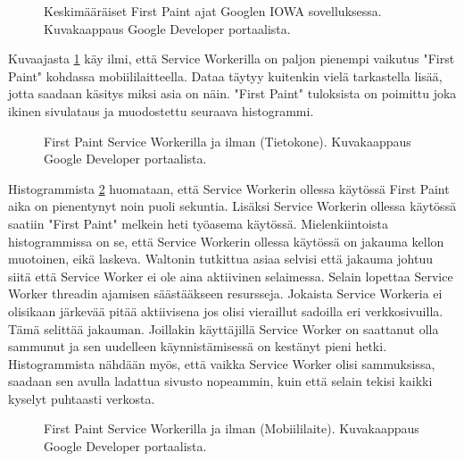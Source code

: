 \documentclass{tktltiki}
\begin{document}
\begin{figure}[!h]
\begin{center}
\caption{Keskimääräiset First Paint ajat Googlen IOWA sovelluksessa. Kuvakaappaus Google Developer portaalista.}
\label{Google AVG load times 1}
\end{center}
\end{figure}

Kuvaajasta \ref{Google AVG load times 1} käy ilmi, että Service Workerilla on paljon pienempi vaikutus "First Paint" kohdassa mobiililaitteella. Dataa täytyy kuitenkin vielä tarkastella lisää, jotta saadaan käsitys miksi asia on näin. "First Paint" tuloksista on poimittu joka ikinen sivulataus ja muodostettu seuraava histogrammi.

\begin{figure}[h]
\begin{center}
\caption{First Paint Service Workerilla ja ilman (Tietokone). Kuvakaappaus Google Developer portaalista.}
\label{Google AVG load times 2}
\end{center}
\end{figure}

Histogrammista \ref{Google AVG load times 2} huomataan, että Service Workerin ollessa käytössä First Paint aika on pienentynyt noin puoli sekuntia. Lisäksi Service Workerin ollessa käytössä saatiin "First Paint" melkein heti työasema käytössä. Mielenkiintoista histogrammissa on se, että Service Workerin ollessa käytössä on jakauma kellon muotoinen, eikä laskeva. Waltonin tutkittua asiaa selvisi että jakauma johtuu siitä että Service Worker ei ole aina aktiivinen selaimessa. Selain lopettaa Service Worker threadin ajamisen säästääkseen resursseja. Jokaista Service Workeria ei olisikaan järkevää pitää aktiivisena jos olisi vieraillut sadoilla eri verkkosivuilla. Tämä selittää jakauman. Joillakin käyttäjillä Service Worker on saattanut olla sammunut ja sen uudelleen käynnistämisessä on kestänyt pieni hetki. Histogrammista nähdään myös, että vaikka Service Worker olisi sammuksissa, saadaan sen avulla ladattua sivusto nopeammin, kuin että selain tekisi kaikki kyselyt puhtaasti verkosta. 

\clearpage

\begin{figure}[h]
\begin{center}
\caption{First Paint Service Workerilla ja ilman (Mobiililaite). Kuvakaappaus Google Developer portaalista.}
\label{Google AVG load times 3}
\end{center}
\end{figure}
\end{document}
